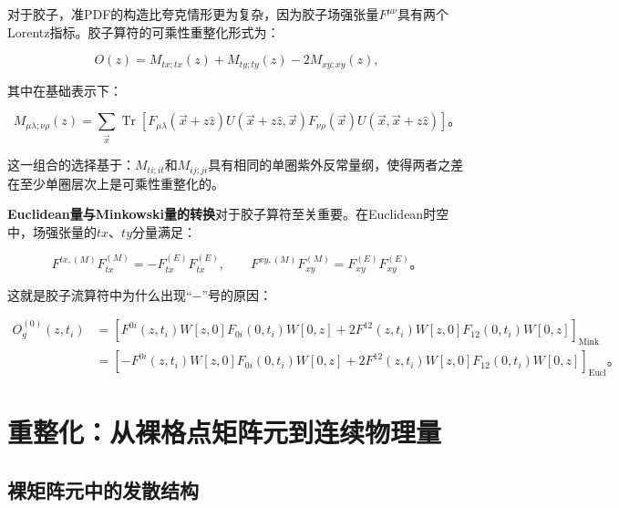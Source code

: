 \documentclass[12pt,a4paper]{ctexart}
\theoremstyle{definition}
\begin{document}
对于胶子，准PDF的构造比夸克情形更为复杂，因为胶子场强张量$F^{\mu\nu}$具有两个Lorentz指标\cite{Balitsky2020,NoteGluonPDFs,Chen2025gluon}。胶子算符的可乘性重整化形式为\cite{Chen2025gluon,Zhang2019}：

\begin{equation}
O(z) = M_{tx;tx}(z) + M_{ty;ty}(z) - 2M_{xy;xy}(z),
\label{eq:gluon_operator}
\end{equation}

其中在基础表示下\cite{Chen2025gluon}：

\begin{equation}
M_{\mu\lambda;\nu\rho}(z) = \sum_{\vec{x}} \operatorname{Tr}[F_{\mu\lambda}(\vec{x} + z\hat{z}) U(\vec{x} + z\hat{z}, \vec{x}) F_{\nu\rho}(\vec{x}) U(\vec{x}, \vec{x} + z\hat{z})]。
\label{eq:gluon_ME}
\end{equation}

这一组合的选择基于：$M_{ti;it}$和$M_{ij;ji}$具有相同的单圈紫外反常量纲，使得两者之差在至少单圈层次上是可乘性重整化的\cite{Balitsky2020}。

\textbf{Euclidean量与Minkowski量的转换}对于胶子算符至关重要\cite{NoteGluonPDFs}。在Euclidean时空中，场强张量的$tx$、$ty$分量满足：

\begin{equation}
F^{tx,(M)}F^{(M)}_{tx} = -F^{(E)}_{tx}F^{(E)}_{tx}, \qquad
F^{xy,(M)}F^{(M)}_{xy} = F^{(E)}_{xy}F^{(E)}_{xy}。
\label{eq:ME_conversion}
\end{equation}

这就是胶子流算符中为什么出现``$-$''号的原因\cite{NoteGluonPDFs}：

\begin{equation}
\begin{aligned}
O^{(0)}_g(z, t_i) &= \left[ F^{0i}(z,t_i)W[z,0]F_{0i}(0,t_i)W[0,z] + 2F^{12}(z,t_i)W[z,0]F_{12}(0,t_i)W[0,z] \right]_{\text{Mink}} \\
&= \left[ -F^{0i}(z,t_i)W[z,0]F_{0i}(0,t_i)W[0,z] + 2F^{12}(z,t_i)W[z,0]F_{12}(0,t_i)W[0,z] \right]_{\text{Eucl}}。
\end{aligned}
\label{eq:gluon_current}
\end{equation}

\section{重整化：从裸格点矩阵元到连续物理量}

\subsection{裸矩阵元中的发散结构}
\end{document}
